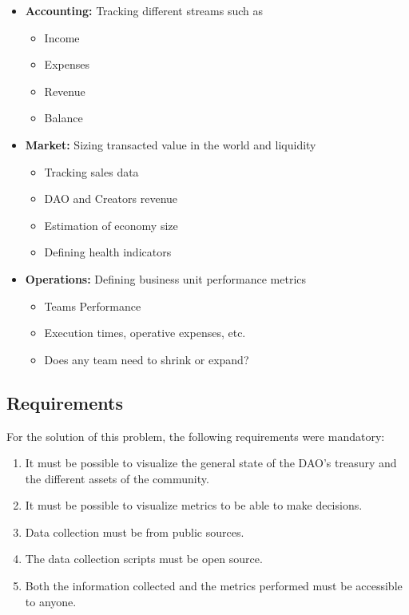 \documentclass[MSE,Master,english]{twbook}%
\begin{document}
\begin{itemize}
  \item \textbf{Accounting:} Tracking different streams such as
  \begin{itemize}
    \item Income
    \item Expenses
    \item Revenue
    \item Balance
  \end{itemize}
  \item \textbf{Market:} Sizing transacted value in the world and liquidity
  \begin{itemize}
    \item Tracking sales data
    \item DAO and Creators revenue
    \item Estimation of economy size
    \item Defining health indicators
  \end{itemize}
  \item \textbf{Operations:} Defining business unit performance metrics
  \begin{itemize}
    \item Teams Performance
    \item Execution times, operative expenses, etc.
    \item Does any team need to shrink or expand?
  \end{itemize}
\end{itemize}

\subsection{Requirements}
For the solution of this problem, the following requirements were mandatory:
\begin{enumerate}
  \item It must be possible to visualize the general state of the DAO's treasury and the different assets of the community.
  \item It must be possible to visualize metrics to be able to make decisions.
  \item Data collection must be from public sources.
  \item The data collection scripts must be open source.
  \item Both the information collected and the metrics performed must be accessible to anyone.
\end{enumerate}
\end{document}
